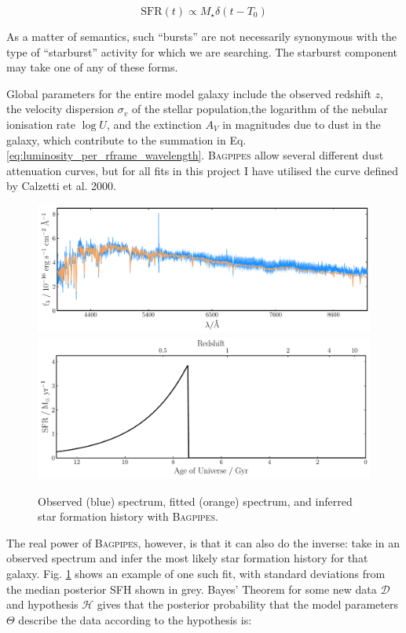 \documentclass[a4paper,12pt]{article}
\begin{document}
\begin{equation}\label{eq:burst_model}
  \mathrm{SFR}(t)\propto
  M_\star \delta(t-T_0)
\end{equation}

\noindent As a matter of semantics, such ``bursts'' are not necessarily
synonymous with the type of ``starburst'' activity for which we are searching.
The starburst component may take one of any of these forms.

Global parameters for the entire model galaxy include the observed redshift
$z$, the velocity dispersion $\sigma_v$ of the stellar population,the logarithm
of the nebular ionisation rate $\log{U}$, and the extinction $A_V$ in
magnitudes due to dust in the galaxy, which contribute to the summation in Eq.
\ref{eq:luminosity_per_rframe_wavelength}. \textsc{Bagpipes} allow several
different dust attenuation curves, but for all fits in this project I have
utilised the curve defined by Calzetti et al. 2000.\cite{Calzetti_2000}

\begin{figure}
  \includegraphics[width=\textwidth]{host_hyz_specwerr_fit}
  \includegraphics[width=\textwidth]{host_hyz_specwerr_sfh}
  \caption{Observed (blue) spectrum, fitted (orange) spectrum, and inferred star formation history with \textsc{Bagpipes}.}
  \label{fig:bagpipes_example_fit}
\end{figure}

The real power of \textsc{Bagpipes}, however, is that it can also do the
inverse: take in an observed spectrum and infer the most likely star formation
history for that galaxy. Fig. \ref{fig:bagpipes_example_fit} shows an example
of one such fit, with standard deviations from the median posterior SFH shown
in grey. Bayes' Theorem for some new data $\mathcal{D}$ and hypothesis
$\mathcal{H}$ gives that the posterior probability that the model parameters
$\Theta$ describe the data according to the hypothesis is:
\end{document}
